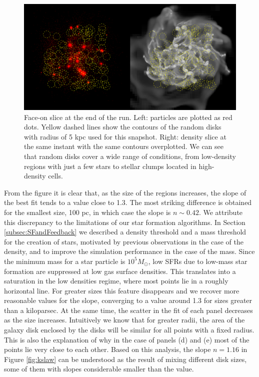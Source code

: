 \documentclass[twocolumn]{aastex}
\newcommand{\msun}{M_\odot}
\begin{document}
	\begin{figure}[h]
	\begin{center}
	\includegraphics[scale=0.4]{./f10.png}
	\caption{Face-on slice at the end of the run. Left: particles are plotted as red dots. Yellow dashed lines show the contours of the random disks with radius of 5 kpc used for this snapshot. Right: density slice at the same instant with the same contours overplotted. We can see that random disks cover a wide range of conditions, from low-density regions with just a few stars to stellar clumps located in high-density cells.}
	\label{fig:random}
	\end{center}
	\end{figure}

From the figure it is clear that, as the size of the regions increases, the slope of the best fit tends to a value close to 1.3. The most striking difference is obtained for the smallest size, 100 pc, in which case the slope is $n \sim 0.42$. We attribute this discrepancy to the limitations of our star formation algorithms. In Section \ref{subsec:SFandFeedback} we described a density threshold and a mass threshold for the creation of stars, motivated by previous observations in the case of the density, and to improve the simulation performance in the case of the mass. Since the minimum mass for a star particle is $10^5 \msun$, low SFRs due to low-mass star formation are suppressed at low gas surface densities. This translates into a saturation in the low densities regime, where most points lie in a roughly horizontal line. For greater sizes this feature disappears and we recover more reasonable values for the slope, converging to a value around 1.3 for sizes greater than a kiloparsec. At the same time, the scatter in the fit of each panel decreases as the size increases. Intuitively we know that for greater radii, the area of the galaxy disk enclosed by the disks will be similar for all points with a fixed radius. This is also the explanation of why in the case of panels (d) and (e) most of the points lie very close to each other. Based on this analysis, the slope $n = 1.16$ in Figure \ref{fig:kslaw} can be understood as the result of mixing different disk sizes, some of them with slopes considerable smaller than the \citet{K98} value.
\end{document}
